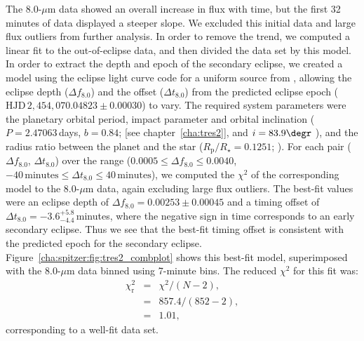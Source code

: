The 8.0-$\mu$m data showed an overall increase in flux with time, but the first 32 minutes of data displayed a steeper slope.
We excluded this initial data and large flux outliers from further analysis.
In order to remove the trend, we computed a linear fit to the out-of-eclipse data, and then divided the data set by this model.
In order to extract the depth and epoch of the secondary eclipse, we created a model using the eclipse light curve code for a uniform source from \citet{Mandel_Agol:apjl:2002a}, allowing the eclipse depth ($\Delta f_{\mathrm {8.0}}$) and the offset ($\Delta t_{\mathrm {8.0}} $) from the predicted eclipse epoch (\mbox{$\mathrm{HJD}\,2,\!454,\!070.04823\pm0.00030$}) to vary.
The required system parameters were the planetary orbital period, impact parameter and orbital inclination (\mbox{$P=2.47063$\,days}, \mbox{$b=0.84$}; \citealt{ODonovan_Charbonneau_Mandushev:apjl:2006a} [see chapter~\ref{cha:tres2}], and \mbox{$i=83.9\degr$} \citealt{Holman_Winn_Latham:apj:2007a}), and the radius ratio between the planet and the star (\mbox{$R_{\mathrm p}/R_{\star}=0.1251$};  \citealt{Holman_Winn_Latham:apj:2007a}).
For each pair ($\Delta f_{\mathrm {8.0}}$, $\Delta t_{\mathrm {8.0}}$) over the range
($0.0005 \le \Delta f_{\mathrm 8.0} \le 0.0040$, $-40\,\mathrm{minutes} \le \Delta t_{\mathrm {8.0}} \le 40\,\mathrm{minutes}$), we computed the $\chi^{2}$ of the corresponding model to the 8.0-$\mu$m data, again excluding large flux outliers.
The best-fit values were an eclipse depth of $\Delta f_{\mathrm {8.0}} = 0.00253 \pm 0.00045$ and a timing offset of $\Delta t_{\mathrm {8.0}} = -3.6^{+5.8}_{-4.4}$\,minutes, where the negative sign in time corresponds to an early secondary eclipse.
Thus we see that the best-fit timing offset is consistent with the predicted epoch for the secondary eclipse.
Figure~\ref{cha:spitzer:fig:tres2_combplot} shows this best-fit model, superimposed with the 8.0-$\mu$m data binned using 7-minute bins.
The reduced $\chi^{2}$ for this fit was:
\begin{eqnarray*}
\chi_{\mathrm r}^{2} & = & \chi^{2}/(N-2), \\
 & = & 857.4/(852-2), \\
 & = & 1.01,
\end{eqnarray*}
corresponding to a well-fit data set.

